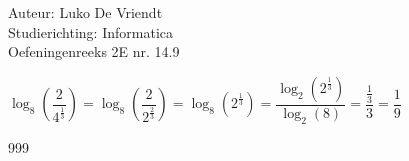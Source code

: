 \documentclass[a4paper]{article}
\begin{document}
\noindent \large Auteur: Luko De Vriendt\\
\noindent \large Studierichting: Informatica\\
\noindent \large Oefeningenreeks 2E nr. 14.9\\

\medskip

\normalsize

$\log_8\left(\dfrac{2}{4^{\tfrac{1}{3}}}\right) = \log_8\left(\dfrac{2}{2^{\tfrac{2}{3}}}\right) = \log_8\left(2^{\tfrac{1}{3}}\right) = \dfrac{\log_2\left(2^{\tfrac{1}{3}}\right)}{\log_2(8)} = \dfrac{\tfrac{1}{3}}{3} = \dfrac{1}{9}$ \\

\begin{thebibliography}{999}
\end{thebibliography}
\end{document}
